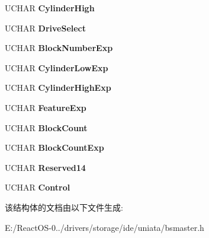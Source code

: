 \begin{DoxyCompactItemize}
U\+C\+H\+AR {\bfseries Cylinder\+High}
\item 
\mbox{\label{struct___a_h_c_i___a_t_a___h2_d___f_i_s_a536c56e8d97a50069e446505ff5d4cd7}} 
U\+C\+H\+AR {\bfseries Drive\+Select}
\item 
\mbox{\label{struct___a_h_c_i___a_t_a___h2_d___f_i_s_aee265e50149fefde11702d07e8cac475}} 
U\+C\+H\+AR {\bfseries Block\+Number\+Exp}
\item 
\mbox{\label{struct___a_h_c_i___a_t_a___h2_d___f_i_s_a7143ae939018271985dae2995cd4a7ac}} 
U\+C\+H\+AR {\bfseries Cylinder\+Low\+Exp}
\item 
\mbox{\label{struct___a_h_c_i___a_t_a___h2_d___f_i_s_af65ff10620c6cdf9a93c4ea7717521b5}} 
U\+C\+H\+AR {\bfseries Cylinder\+High\+Exp}
\item 
\mbox{\label{struct___a_h_c_i___a_t_a___h2_d___f_i_s_ac8408b7606c80274a46fb040fdd45655}} 
U\+C\+H\+AR {\bfseries Feature\+Exp}
\item 
\mbox{\label{struct___a_h_c_i___a_t_a___h2_d___f_i_s_ac26b80146fa7eb6f0de1b591a88250d5}} 
U\+C\+H\+AR {\bfseries Block\+Count}
\item 
\mbox{\label{struct___a_h_c_i___a_t_a___h2_d___f_i_s_a908f9e8c2b358178047dcb5f12a665bd}} 
U\+C\+H\+AR {\bfseries Block\+Count\+Exp}
\item 
\mbox{\label{struct___a_h_c_i___a_t_a___h2_d___f_i_s_ac37a9a25c5e4c82d247cbf58449d1772}} 
U\+C\+H\+AR {\bfseries Reserved14}
\item 
\mbox{\label{struct___a_h_c_i___a_t_a___h2_d___f_i_s_a2ab3de03785657c1e7a3fcc9531850eb}} 
U\+C\+H\+AR {\bfseries Control}
\end{DoxyCompactItemize}


该结构体的文档由以下文件生成\+:\begin{DoxyCompactItemize}
\item 
E\+:/\+React\+O\+S-\/0../drivers/storage/ide/uniata/bsmaster.\+h\end{DoxyCompactItemize}

